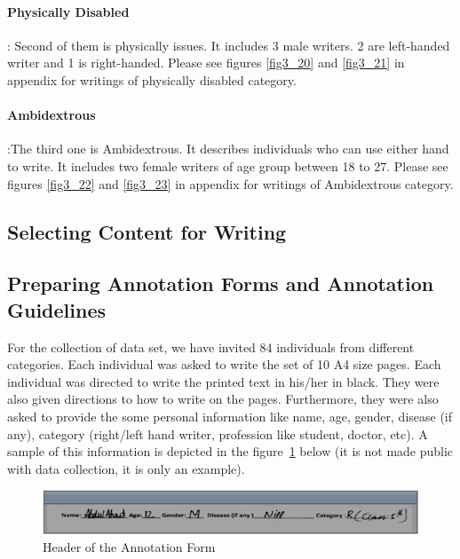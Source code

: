 
\paragraph{Physically Disabled}: Second of them is physically issues. It includes 3 male writers.  2 are left-handed writer and 1 is right-handed. Please see figures \ref{fig3_20} and \ref{fig3_21} in appendix for writings of physically disabled category.




\paragraph{Ambidextrous}:The third one is Ambidextrous. It describes individuals who can use either hand to write. It includes two female writers of age group between 18 to 27. Please see figures \ref{fig3_22} and \ref{fig3_23} in appendix for writings of Ambidextrous category.




\subsection{Selecting Content for Writing }

\subsection{Preparing Annotation Forms and Annotation Guidelines }
For the collection of data set, we have invited 84 individuals from different categories. Each individual was asked to write the set of 10 A4 size pages. Each individual was directed to write the printed text in his/her in black. They were also given directions to how to write on the pages. Furthermore, they were also asked to provide the some personal information like name, age, gender, disease (if any), category (right/left hand writer, profession like student, doctor, etc). A sample of this information is depicted in the figure~\ref{fig3_1} below (it is not made public with data collection, it is only an example).

\begin{figure}[t]
\centering
	\includegraphics[width=8.cm]{figures/Fig3_1.png}
\caption{Header of the Annotation Form}\label{fig3_1}
\end{figure}

